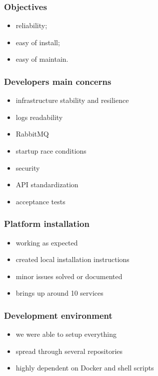 \documentclass{beamer}
\begin{document}
  \begin{frame}
    \frametitle{Objectives}

    \begin{itemize}
      \item reliability;
      \item easy of install;
      \item easy of maintain.
    \end{itemize}
  \end{frame}

  \begin{frame}
    \frametitle{Developers main concerns}

    \begin{itemize}
      \item infrastructure stability and resilience
      \item logs readability
      \item RabbitMQ
      \item startup race conditions
      \item security
      \item API standardization
      \item acceptance tests
    \end{itemize}
  \end{frame}

  \begin{frame}
    \frametitle{Platform installation}

    \begin{itemize}
      \item working as expected
      \item created local installation instructions
      \item minor issues solved or documented
      \item brings up around 10 services
    \end{itemize}
  \end{frame}

  \begin{frame}
    \frametitle{Development environment}

    \begin{itemize}
      \item we were able to setup everything
      \item spread through several repositories
      \item highly dependent on Docker and shell scripts
    \end{itemize}
  \end{frame}
\end{document}
